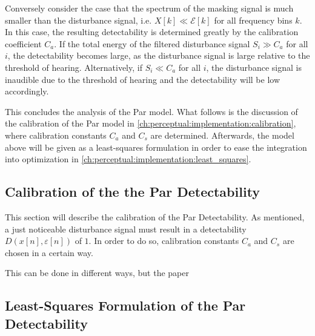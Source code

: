 Conversely consider the case that the spectrum of the masking signal is much smaller than the disturbance signal,
i.e. $X[k] \ll \mathcal{E}[k]$ for all frequency bins $k$.
In this case, the resulting detectability is determined greatly by the calibration coefficient $C_a$. 
If the total energy of the filtered disturbance signal $S_i \gg C_a$ for all $i$,
the detectability becomes large, as the disturbance signal is large relative to the threshold of hearing.
Alternatively, if $S_i \ll C_a$ for all $i$, the disturbance signal is inaudible due to the threshold of hearing and 
the detectability will be low accordingly.

This concludes the analysis of the Par model.
What follows is the discussion of the calibration of the Par model in \autoref{ch:perceptual:implementation:calibration},
where calibration constants $C_a$ and $C_s$ are determined.
Afterwards, the model above will be given as a least-squares formulation in order to ease the integration
into optimization in \autoref{ch:perceptual:implementation:least_squares}.

\subsection{Calibration of the the Par Detectability}
\label{ch:perceptual:implementation:calibration}
This section will describe the calibration of the Par Detectability.
As mentioned, a just noticeable disturbance signal must result in a detectability $D(x[n],\varepsilon[n])$ of $1$.
In order to do so, calibration constants $C_a$ and $C_s$ are chosen in a certain way.

This can be done in different ways, but the paper~\cite{van2005perceptual} 

\subsection{Least-Squares Formulation of the Par Detectability}
\label{ch:perceptual:implementation:least_squares}
